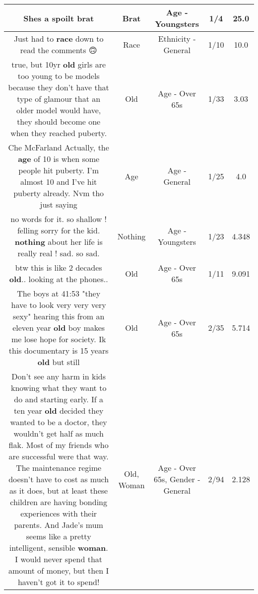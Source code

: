 \documentclass[11pt]{article}
\newlength\mylength
\begin{document}
\begin{center}
\begin{longtable}{|C{.65\mylength}|C{.30\mylength}|C{.12\mylength}|C{.12\mylength}|C{.12\mylength}|}
  \small Shes a spoilt brat\normalsize   & Brat & Age - Youngsters & 1/4 & 25.0 \\  \hline
  \small Just had to \textbf{race} down to read the comments 🙃\normalsize   & Race & Ethnicity - General & 1/10 & 10.0 \\  \hline
  \small true, but 10yr \textbf{old} girls are too young to be models because they don't have that type of glamour that an older model would have, they should become one when they reached puberty.\normalsize   & Old & Age - Over 65s & 1/33 & 3.03 \\  \hline
  \small Che McFarland Actually, the \textbf{age} of 10 is when some people hit puberty. I'm almost 10 and I've hit puberty already. Nvm tho just saying\normalsize   & Age & Age - General & 1/25 & 4.0 \\  \hline
  \small no words for it. so shallow ! felling sorry for the kid. \textbf{nothing} about her life is really real ! sad. so sad.\normalsize   & Nothing & Age - Youngsters & 1/23 & 4.348 \\  \hline
  \small btw this is like 2 decades \textbf{old}.. looking at the phones..\normalsize   & Old & Age - Over 65s & 1/11 & 9.091 \\  \hline
  \small The boys at 41:53 "they have to look very very very sexy" hearing this from an eleven year \textbf{old} boy makes me lose hope for society. Ik this documentary is 15 years \textbf{old} but still\normalsize   & Old & Age - Over 65s & 2/35 & 5.714 \\  \hline
  \small Don't see any harm in kids knowing what they want to do and starting early. If a ten year \textbf{old} decided they wanted to be a doctor, they wouldn't get half as much flak. Most of my friends who are successful were that way. The maintenance regime doesn't have to cost as much as it does, but at least these children are having bonding experiences with their parents. And Jade's mum seems like a pretty intelligent, sensible \textbf{woman}. I would never spend that amount of money, but then I haven't got it to spend!\normalsize   & Old, Woman & Age - Over 65s, Gender - General & 2/94 & 2.128 \\  \hline

\end{longtable}
\end{center}
\end{document}
